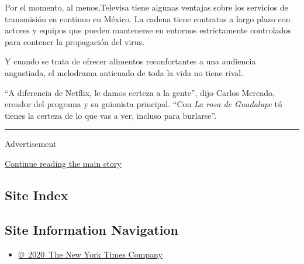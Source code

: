 Por el momento, al menos,Televisa tiene algunas ventajas sobre los
servicios de transmisión en continuo en México. La cadena tiene
contratos a largo plazo con actores y equipos que pueden mantenerse en
entornos estrictamente controlados para contener la propagación del
virus.

Y cuando se trata de ofrecer alimentos reconfortantes a una audiencia
angustiada, el melodrama anticuado de toda la vida no tiene rival.

``A diferencia de Netflix, le damos certeza a la gente'', dijo Carlos
Mercado, creador del programa y su guionista principal. ``Con \emph{La
rosa de Guadalupe} tú tienes la certeza de lo que vas a ver, incluso
para burlarse''.

\begin{center}\rule{0.5\linewidth}{\linethickness}\end{center}

Advertisement

\protect\hyperlink{after-bottom}{Continue reading the main story}

\hypertarget{site-index}{%
\subsection{Site Index}\label{site-index}}

\hypertarget{site-information-navigation}{%
\subsection{Site Information
Navigation}\label{site-information-navigation}}

\begin{itemize}
\tightlist
\item
  \href{https://help.nytimes.com/hc/en-us/articles/115014792127-Copyright-notice}{©~2020~The
  New York Times Company}
\end{itemize}


